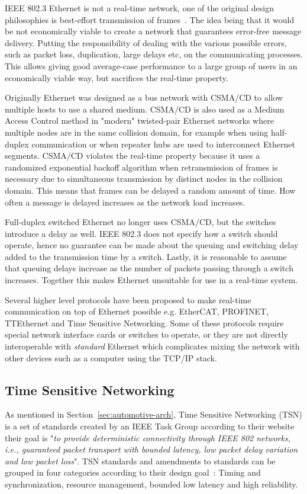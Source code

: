 IEEE 802.3 Ethernet is not a real-time network, one of the original design philosophies is best-effort transmission of frames~\cite{metcalfe1976ethernet}. The idea being that it would be not economically viable to create a network that guarantees error-free message delivery. Putting the responsibility of dealing with the various possible errors, such as packet loss, duplication, large delays etc, on the communicating processes. This allows giving good average-case performance to a large group of users in an economically viable way, but sacrifices the real-time property. 

Originally Ethernet was designed as a bus network with CSMA/CD to allow multiple hosts to use a shared medium. CSMA/CD is also used as a Medium Access Control method in "modern" twisted-pair Ethernet networks where multiple nodes are in the same collision domain, for example when using half-duplex communication or when repeater hubs are used to interconnect Ethernet segments. CSMA/CD violates the real-time property because it uses a randomized exponential backoff algorithm when retransmission of frames is necessary due to simultaneous transmission by distinct nodes in the collision domain. This means that frames can be delayed a random amount of time. How often a message is delayed increases as the network load increases.

Full-duplex switched Ethernet no longer uses CSMA/CD, but the switches introduce a delay as well. IEEE 802.3 does not specify how a switch should operate, hence no guarantee can be made about the queuing and switching delay added to the transmission time by a switch. Lastly, it is reasonable to assume that queuing delays increase as the number of packets passing through a switch increases. Together this makes Ethernet unsuitable for use in a real-time system. 

Several higher level protocols have been proposed to make real-time communication on top of Ethernet possible e.g. EtherCAT, PROFINET, TTEthernet and Time Sensitive Networking. Some of these protocols require special network interface cards or switches to operate, or they are not directly interoperable with \textit{standard} Ethernet which complicates mixing the network with other devices such as a computer using the TCP/IP stack. 

\subsection{Time Sensitive Networking}
As mentioned in Section~\ref{sec:automotive-arch}, Time Sensitive Networking (TSN) is a set of standards created by an IEEE Task Group according to their website their goal is "\textit{to provide deterministic connectivity through IEEE 802 networks, i.e., guaranteed packet transport with bounded latency, low packet delay variation and low packet loss}". TSN standards and amendments to standards can be grouped in four categories according to their design goal~\cite{ashjaei2021time}: Timing and synchronization, resource management, bounded low latency and high reliability.


